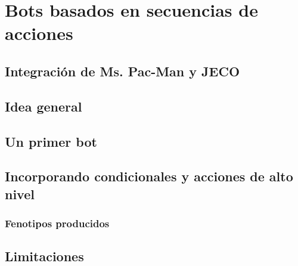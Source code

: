 \chapter{Bots basados en secuencias de acciones}

\section{Integración de Ms. Pac-Man y JECO}

\section{Idea general}

\section{Un primer bot}

\section{Incorporando condicionales y acciones de alto nivel}

\subsection{Fenotipos producidos}

\section{Limitaciones}
